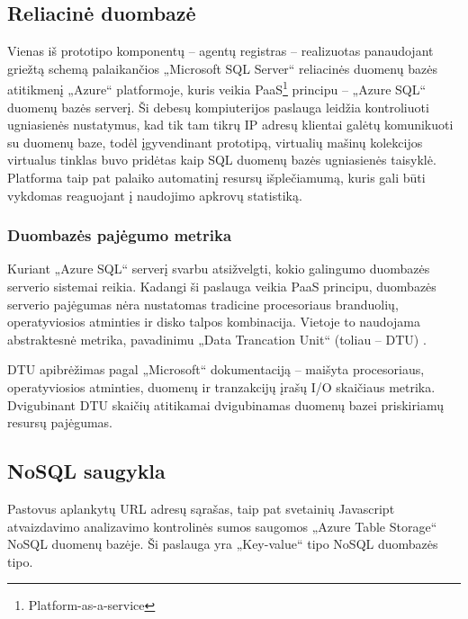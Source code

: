 \subsection{Reliacinė duombazė}

Vienas iš prototipo komponentų -- agentų registras -- realizuotas panaudojant griežtą schemą palaikančios „Microsoft SQL Server“ reliacinės duomenų bazės atitikmenį „Azure“ platformoje, kuris veikia PaaS\footnote{Platform-as-a-service} principu -- „Azure SQL“ duomenų bazės serverį. Ši debesų kompiuterijos paslauga leidžia kontroliuoti ugniasienės nustatymus, kad tik tam tikrų IP adresų klientai galėtų komunikuoti su duomenų baze, todėl įgyvendinant prototipą, virtualių mašinų kolekcijos virtualus tinklas buvo pridėtas kaip SQL duomenų bazės ugniasienės taisyklė. Platforma taip pat palaiko automatinį resursų išplečiamumą, kuris gali būti vykdomas reaguojant į naudojimo apkrovų statistiką.

\subsubsection{Duombazės pajėgumo metrika}

Kuriant „Azure SQL“ serverį svarbu atsižvelgti, kokio galingumo duombazės serverio sistemai reikia. Kadangi ši paslauga veikia PaaS principu, duombazės serverio pajėgumas nėra nustatomas tradicine procesoriaus branduolių, operatyviosios atminties ir disko talpos kombinacija. Vietoje to naudojama abstraktesnė metrika, pavadinimu „Data Trancation Unit“ (toliau -- DTU) \cite{DTUMetric}.

DTU apibrėžimas pagal „Microsoft“ dokumentaciją -- maišyta procesoriaus, operatyviosios atminties, duomenų ir tranzakcijų įrašų I/O skaičiaus metrika. \cite{DTUMetric} Dvigubinant DTU skaičių atitikamai dvigubinamas duomenų bazei priskiriamų resursų pajėgumas.

\subsection{NoSQL saugykla}

Pastovus aplankytų URL adresų sąrašas, taip pat svetainių Javascript atvaizdavimo analizavimo kontrolinės sumos saugomos „Azure Table Storage“ NoSQL duomenų bazėje. Ši paslauga yra „Key-value“ tipo NoSQL duombazės tipo. 

